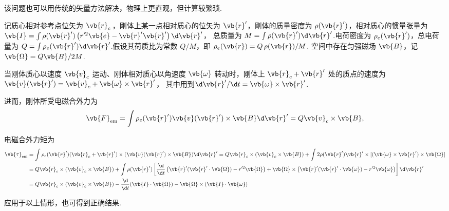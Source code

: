 \begin{notes}
	该问题也可以用传统的矢量方法解决，物理上更直观，但计算较繁琐.

	记质心相对参考点位矢为 \(\vb{r}_c\,\)，刚体上某一点相对质心的位矢为 \(\vb{r}'\)，刚体的质量密度为 \(\rho(\vb{r}')\)，相对质心的惯量张量为 \(\vb{I}= \int \rho(\vb{r}') \left( r'^2 \vb{e} - \vb{r}' \vb{r}' \right) \d \vb{r}'\)，
	总质量为 \(M = \int \rho(\vb{r}') \d \vb{r}'\).电荷密度为 \(\rho_e(\vb{r}')\)，总电荷量为 \(Q = \int \rho_e(\vb{r}') \d \vb{r}'\).假设其荷质比为常数 \(Q/M\)，即 \(\rho_e(\vb{r}) = Q \,\rho(\vb{r})/M\).
	空间中存在匀强磁场 \(\vb{B}\)，记 \(\vb{\Omega} = Q\vb{B}/2M\).

	当刚体质心以速度 \(\vb{v}_c\) 运动、刚体相对质心以角速度 \(\vb{\omega}\) 转动时，刚体上 \(\vb{r}_c + \vb{r}'\) 处的质点的速度为 \(\vb{v}(\vb{r}') = \vb{v}_c + \vb{\omega} \times \vb{r}'\)，
	其中用到\(\d \vb{r}'/\d t = \vb{\omega} \times \vb{r}'\).

	进而，刚体所受电磁合外力为
	\begin{equation*}
		\vb{F}_{\text{em}} = \int \rho_e(\vb{r}') \vb{v}(\vb{r}') \times \vb{B} \d \vb{r}' = Q \vb{v}_c \times \vb{B},
	\end{equation*}

	电磁合外力矩为
	\begin{align*}
		\vb{\tau}_{\text{em}} & = \int \rho_e(\vb{r}') (\vb{r}_c + \vb{r}') \times (\vb{v}(\vb{r}') \times \vb{B}) \d \vb{r}' = Q \vb{r}_c \times (\vb{v}_c \times \vb{B}) + \int 2 \rho(\vb{r}') \vb{r}' \times [(\vb{\omega} \times \vb{r}') \times \vb{\Omega}]                                           \\
		                      & = Q \vb{r}_c \times (\vb{v}_c \times \vb{B}) + \int \rho(\vb{r}') \left[ \frac{\d}{\d t} \left( \vb{r}' (\vb{r}' \cdot \vb{\Omega}) - r'^2 \vb{\Omega} \right) + \vb{\Omega} \times \left( \vb{r}' (\vb{r}' \cdot \vb{\omega}) - r'^2 \vb{\omega} \right) \right] \d \vb{r}' \\
		                      & = Q \vb{r}_c \times (\vb{v}_c \times \vb{B}) - \frac{\d}{\d t} (\vb{I} \cdot \vb{\Omega}) - \vb{\Omega} \times (\vb{I} \cdot \vb{\omega})
	\end{align*}

	应用于以上情形，也可得到正确结果.
\end{notes}
